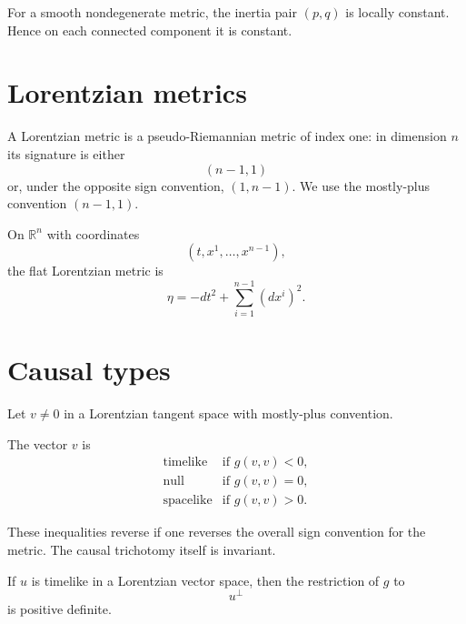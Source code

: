 \begin{proposition}\label{prop:vii29-local-constant}
For a smooth nondegenerate metric, the inertia pair \((p,q)\) is locally constant.
Hence on each connected component it is constant.
\end{proposition}

\section{Lorentzian metrics}

\begin{definition}\label{def:vii29-lorentzian}
A Lorentzian metric is a pseudo-Riemannian metric of index one: in dimension \(n\)
its signature is either
\[
(n-1,1)
\]
or, under the opposite sign convention, \((1,n-1)\).
We use the mostly-plus convention \((n-1,1)\).
\end{definition}

\begin{example}\label{ex:vii29-minkowski}
On \(\mathbb R^n\) with coordinates
\[
(t,x^1,\dots,x^{n-1}),
\]
the flat Lorentzian metric is
\[
\eta
=
-dt^2+\sum_{i=1}^{n-1}(dx^i)^2.
\]
\end{example}

\section{Causal types}

Let \(v\ne0\) in a Lorentzian tangent space with mostly-plus convention.

\begin{definition}\label{def:vii29-causal}
The vector \(v\) is
\[
\begin{array}{ll}
\text{timelike} & \text{if }g(v,v)<0,\\
\text{null} & \text{if }g(v,v)=0,\\
\text{spacelike} & \text{if }g(v,v)>0.
\end{array}
\]
\end{definition}

\begin{remark}
These inequalities reverse if one reverses the overall sign convention for the
metric.  The causal trichotomy itself is invariant.
\end{remark}

\begin{proposition}\label{prop:vii29-timelike-orth}
If \(u\) is timelike in a Lorentzian vector space, then the restriction of \(g\) to
\[
u^\perp
\]
is positive definite.
\end{proposition}

